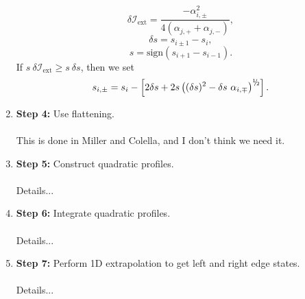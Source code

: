 \begin{enumerate}
\begin{equation}
\delta\mathcal{I}_{\text{ext}} = \frac{-\alpha_{i,\pm}^2}{4\left(\alpha_{j,+}+\alpha_{j,-}\right)},
\end{equation}
\begin{equation}
\delta s = s_{i\pm 1} - s_i,
\end{equation}
\begin{equation}
s = \text{sign}\left(s_{i+1}-s_{i-1}\right).
\end{equation}
If $s ~ \delta\mathcal{I}_{\text{ext}} \ge s ~ \delta s$, then we set
\begin{equation}
s_{i,\pm} = s_i - \left[2\delta s + 2s\left((\delta s)^2 - \delta s ~  \alpha_{i,\mp}\right)^{\myhalf}\right].
\end{equation}
\item {\bf Step 4:} Use flattening.\\ \\
This is done in Miller and Colella, and I don't think we need it.
\item {\bf Step 5:} Construct quadratic profiles.\\ \\
Details...
\item {\bf Step 6:} Integrate quadratic profiles.\\ \\
Details...
\item {\bf Step 7:} Perform 1D extrapolation to get left and right edge states.\\ \\
Details...
\end{enumerate}
